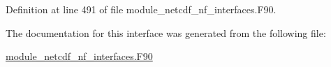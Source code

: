 Definition at line 491 of file module\+\_\+netcdf\+\_\+nf\+\_\+interfaces.\+F90.



The documentation for this interface was generated from the following file\+:\begin{DoxyCompactItemize}
\item 
\hyperlink{module__netcdf__nf__interfaces_8F90}{module\+\_\+netcdf\+\_\+nf\+\_\+interfaces.\+F90}\end{DoxyCompactItemize}
